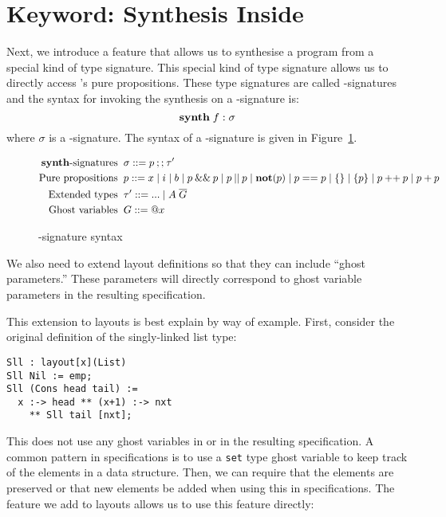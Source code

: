 \section{\synth{} Keyword: Synthesis Inside \Pika}
\label{sec:synth}

Next, we introduce a feature that allows us to synthesise a program from a special kind of \Pika{} type signature. This special kind of type signature allows us to directly access \SuSLik's pure propositions. These type signatures are called \synth-signatures and the syntax for invoking the \Pika{} synthesis on a \synth-signature is:
\[
  \textbf{synth}\; f : \sigma
\]
\noindent
where $\sigma$ is a \synth-signature. The syntax of a \synth-signature is given in Figure~\ref{fig:synth-sig-syntax}.

\begin{figure}
\[
\begin{aligned}
  \textnormal{\textbf{synth}-signatures}\;\; &\sigma ::= p \mathbin{;;} \tau'\\
  \textnormal{Pure propositions}\;\; &p ::= x \mid i \mid b \mid p \mathbin{\&\&} p \mid p \mathbin{||} p
    \mid \textbf{not}(p) \mid p == p \mid \{\} \mid \{p\} \mid p \mathbin{++} p \mid p + p\\
  \textnormal{Extended types}\;\; &\tau' ::= ... \mid A\; \overline{G}\\
  \textnormal{Ghost variables}\;\; &G ::= @x
\end{aligned}
\]
  \caption{\synth-signature syntax}
  \label{fig:synth-sig-syntax}
\end{figure}

\noindent
We also need to extend layout definitions so that they can include ``ghost parameters.'' These parameters will directly correspond to ghost variable parameters in the resulting \SuSLik{} specification.

This extension to layouts is best explain by way of example. First, consider the original definition of the singly-linked list type:

\begin{lstlisting}
Sll : layout[x](List)
Sll Nil := emp;
Sll (Cons head tail) :=
  x :-> head ** (x+1) :-> nxt
    ** Sll tail [nxt];
\end{lstlisting}

\noindent
This does not use any ghost variables in \Pika{} or in the resulting \SuSLik{} specification. A common pattern in \SuSLik{} specifications is to use a \verb|set| type ghost variable to keep track of the elements in a data structure. Then, we can require that the elements are preserved or that new elements be added when using this in specifications. The feature we add to layouts allows us to use this feature directly:

